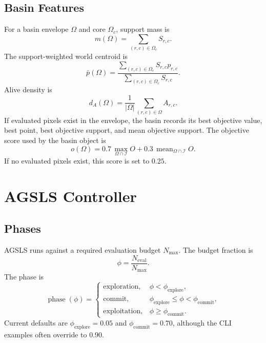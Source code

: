 \documentclass[11pt]{article}
\newcommand{\code}[1]{\texttt{\detokenize{#1}}}
\newcommand{\mean}{\operatorname{mean}}
\begin{document}
\subsection{Basin Features}

For a basin envelope $\Omega$ and core $\Omega_c$, support mass is
\begin{equation}
m(\Omega)=\sum_{(r,c)\in\Omega_c} S_{r,c}.
\label{eq:support-mass}
\end{equation}
The support-weighted world centroid is
\begin{equation}
\bar p(\Omega)=
\frac{\sum_{(r,c)\in\Omega_c}S_{r,c}p_{r,c}}
{\sum_{(r,c)\in\Omega_c}S_{r,c}}.
\label{eq:basin-centroid}
\end{equation}
Alive density is
\begin{equation}
d_A(\Omega)=\frac{1}{|\Omega|}\sum_{(r,c)\in\Omega} A_{r,c}.
\label{eq:alive-density}
\end{equation}
If evaluated pixels exist in the envelope, the basin records its best
objective value, best point, best objective support, and mean objective
support. The objective score used by the basin object is
\begin{equation}
o(\Omega)=0.7\,\max_{\Omega\cap\mathcal{I}} O
+0.3\,\mean_{\Omega\cap\mathcal{I}} O.
\label{eq:basin-objective-score}
\end{equation}
If no evaluated pixels exist, this score is set to $0.25$.

\section{AGSLS Controller}

\subsection{Phases}

AGSLS runs against a required evaluation budget $N_{\max}$. The budget
fraction is
\begin{equation}
\phi = \frac{N_{\mathrm{eval}}}{N_{\max}}.
\label{eq:budget-fraction}
\end{equation}
The phase is
\begin{equation}
\operatorname{phase}(\phi)=
\begin{cases}
\mathrm{exploration}, & \phi < \phi_{\mathrm{explore}},\\
\mathrm{commit}, & \phi_{\mathrm{explore}}\le \phi < \phi_{\mathrm{commit}},\\
\mathrm{exploitation}, & \phi \ge \phi_{\mathrm{commit}}.
\end{cases}
\label{eq:phase-rule}
\end{equation}
Current defaults are $\phi_{\mathrm{explore}}=0.05$ and
$\phi_{\mathrm{commit}}=0.70$, although the CLI examples often override
\code{commit_fraction} to $0.90$.
\end{document}
